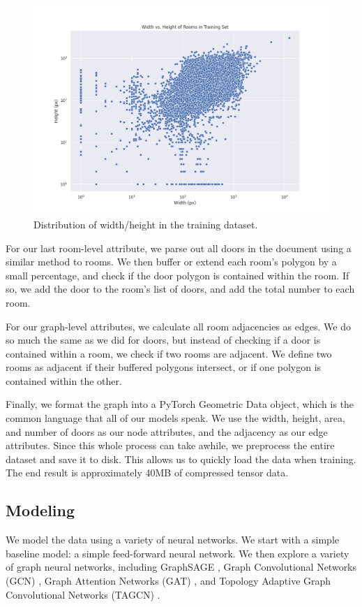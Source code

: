 \documentclass{article}
\begin{document}
\begin{figure}
    \centering
    \includegraphics[width=.9\textwidth]{figures/dim-dist.png}
    \caption{Distribution of width/height in the training dataset.}
    \label{fig:dim-dist}
\end{figure}

For our last room-level attribute, we parse out all doors in the document using a similar method to rooms. We then buffer or extend each room's polygon by a small percentage, and check if the door polygon is contained within the room. If so, we add the door to the room's list of doors, and add the total number to each room.

For our graph-level attributes, we calculate all room adjacencies as edges. We do so much the same as we did for doors, but instead of checking if a door is contained within a room, we check if two rooms are adjacent. We define two rooms as adjacent if their buffered polygons intersect, or if one polygon is contained within the other.

Finally, we format the graph into a PyTorch Geometric Data object, which is the common language that all of our models speak. We use the width, height, area, and number of doors as our node attributes, and the adjacency as our edge attributes. Since this whole process can take awhile, we preprocess the entire dataset and save it to disk. This allows us to quickly load the data when training. The end result is approximately 40MB of compressed tensor data.

\subsection{Modeling}

We model the data using a variety of neural networks. We start with a simple baseline model: a simple feed-forward neural network. We then explore a variety of graph neural networks, including GraphSAGE \cite{graphsage}, Graph Convolutional Networks (GCN) \cite{gcn}, Graph Attention Networks (GAT) \cite{gat}, and Topology Adaptive Graph Convolutional Networks (TAGCN) \cite{tagcn}.
\end{document}
